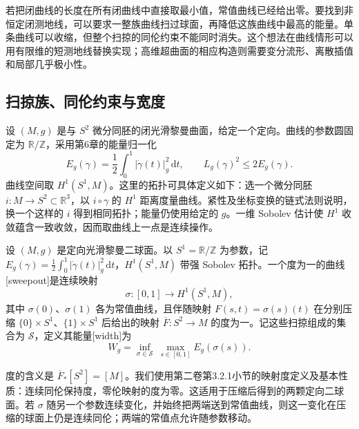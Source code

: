 
% 
% 
% 
% 


若把闭曲线的长度在所有闭曲线中直接取最小值，常值曲线已经给出零。要找到非恒定闭测地线，可以要求一整族曲线扫过球面，再降低这族曲线中最高的能量。单条曲线可以收缩，但整个扫掠的同伦约束不能同时消失。这个想法在曲线情形可以用有限维的短测地线替换实现；高维超曲面的相应构造则需要变分流形、离散插值和局部几乎极小性。

\subsection{扫掠族、同伦约束与宽度}
\label{g3:subsec:2305:01}
设 \((M,g)\) 是与 \(S^2\) 微分同胚的闭光滑黎曼曲面，给定一个定向。曲线的参数圆固定为 \(\mathbb R/\mathbb Z\)，采用第6章的能量归一化
\[
	E_g(\gamma)=\frac12\int_0^1|\dot\gamma(t)|_g^2\,\mathrm dt,
	\qquad L_g(\gamma)^2\le2E_g(\gamma).
\]
曲线空间取 \(H^1(S^1,M)\)。这里的拓扑可具体定义如下：选一个微分同胚 \(i:M\to S^2\subset\mathbb R^3\)，以 \(i\circ\gamma\) 的 \(H^1\) 距离度量曲线。紧性及坐标变换的链式法则说明，换一个这样的 \(i\) 得到相同拓扑；能量仍使用给定的 \(g\)。一维 Sobolev 估计使 \(H^1\) 收敛蕴含一致收敛，因而取曲线上一点是连续操作。

\begin{definition}\label{g3:def:degree-one-curve-sweepout}
	设 \((M,g)\) 是定向光滑黎曼二球面。以 \(S^1=\mathbb R/\mathbb Z\) 为参数，记 \(E_g(\gamma)=\tfrac12\int_0^1|\dot\gamma(t)|_g^2\,\mathrm dt\)，\(H^1(S^1,M)\) 带强 Sobolev 拓扑。一个度为一的曲线[sweepout]是连续映射
	\[
		\sigma:[0,1]\longrightarrow H^1(S^1,M),
	\]
	其中 \(\sigma(0)\)、\(\sigma(1)\) 各为常值曲线，且伴随映射 \(F(s,t)=\sigma(s)(t)\) 在分别压缩 \(\{0\}\times S^1\)、\(\{1\}\times S^1\) 后给出的映射 \(\overline F:S^2\to M\) 的度为一。记这些扫掠组成的集合为 \(\mathscr S\)，定义其能量[width]为
	\begin{equation}\label{g3:eq:curve-sweepout-width}
		W_g=\inf_{\sigma\in\mathscr S}\ \max_{s\in[0,1]}E_g(\sigma(s)).
	\end{equation}
\end{definition}
度的含义是 \(\overline F_*[S^2]=[M]\)。我们使用第二卷第3.2.1小节的映射度定义及基本性质：连续同伦保持度，零伦映射的度为零。这适用于压缩后得到的两颗定向二球面。若 \(\sigma\) 随另一个参数连续变化，并始终把两端送到常值曲线，则这一变化在压缩的球面上仍是连续同伦；两端的常值点允许随参数移动。


